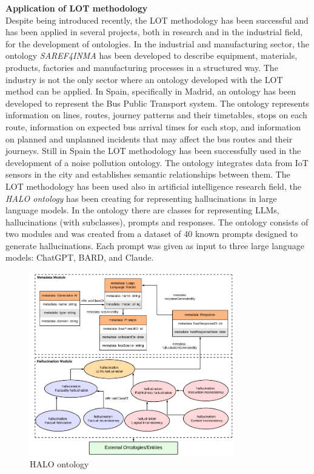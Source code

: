 \textbf{Application of LOT methodology}\\
Despite being introduced recently, the LOT methodology has been successful and has been applied in several projects, both in research and in the industrial field, for the development of ontologies. In the industrial and manufacturing sector, the ontology \textit{SAREF4INMA} \cite{de2020saref4inma} has been developed to describe equipment, materials, products, factories and manufacturing processes in a structured way. The industry is not the only sector where an ontology developed with the LOT method can be applied. In Spain, specifically in Madrid, an ontology has been developed to represent the Bus Public Transport system. \cite{ruckhaus2023applying} The ontology represents information on lines, routes, journey patterns and their timetables, stops on each route, information on expected bus arrival times for each stop, and information on planned and unplanned incidents that may affect the bus routes and their journeys. Still in Spain the LOT methodology has been successfully used in the development of a noise pollution ontology.\cite{espinoza2020using} The ontology integrates data from IoT sensors in the city and establishes semantic relationships between them. The LOT methodology has been used also in artificial intelligence research field, the \textit{HALO ontology} \cite{nananukul2024halo} has been creating for representing hallucinations in large language models. In the ontology there are classes for representing LLMs, hallucinations (with subclasses), prompts and responses. The ontology consists of two modules and was created from a dataset of 40 known prompts designed to generate hallucinations. Each prompt was given as input to three large language models: ChatGPT, BARD, and Claude.
\begin{figure}[H]
    \centering
    \includegraphics[width=0.7\linewidth, height=8cm]{Figures/fig_4.png}
    \caption{HALO ontology}
    \label{fig:enter-label}
\end{figure}
